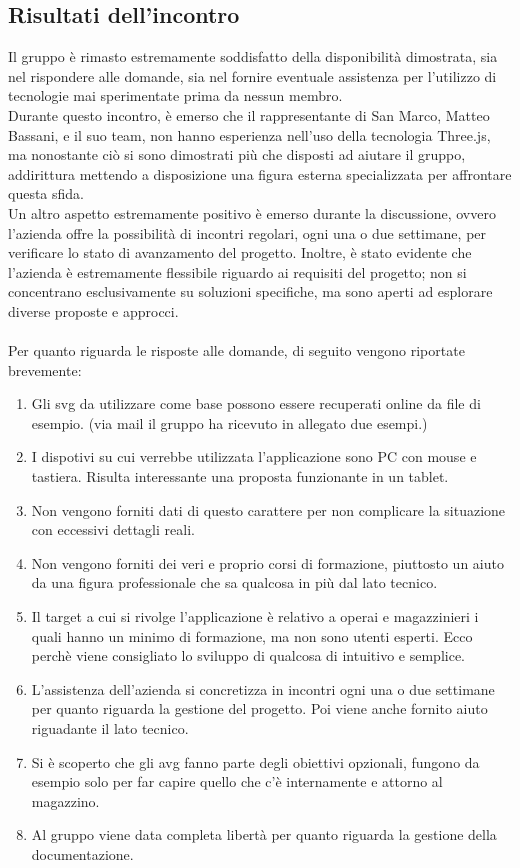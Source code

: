 \subsection{Risultati dell'incontro}
Il gruppo è rimasto estremamente soddisfatto della disponibilità dimostrata, sia nel rispondere alle domande, sia nel fornire eventuale assistenza per l'utilizzo di tecnologie mai sperimentate prima da nessun membro. 
\\ Durante questo incontro, è emerso che il rappresentante di San Marco, Matteo Bassani, e il suo team, non hanno esperienza nell'uso della tecnologia Three.js, ma nonostante ciò si sono dimostrati più che disposti ad aiutare il gruppo, addirittura mettendo a disposizione una figura esterna specializzata per affrontare questa sfida.
\\ Un altro aspetto estremamente positivo è emerso durante la discussione, ovvero l'azienda offre la possibilità di incontri regolari, ogni una o due settimane, per verificare lo stato di avanzamento del progetto. Inoltre, è stato evidente che l'azienda è estremamente flessibile riguardo ai requisiti del progetto; non si concentrano esclusivamente su soluzioni specifiche, ma sono aperti ad esplorare diverse proposte e approcci.
\\ \\ Per quanto riguarda le risposte alle domande, di seguito vengono riportate brevemente:

\begin{enumerate}
    \item Gli svg da utilizzare come base possono essere recuperati online da file di esempio. (via mail il gruppo ha ricevuto in allegato due esempi.)
    \item I dispotivi su cui verrebbe utilizzata l'applicazione sono PC con mouse e tastiera. Risulta interessante una proposta funzionante in un tablet.
    \item Non vengono forniti dati di questo carattere per non complicare la situazione con eccessivi dettagli reali.
    \item Non vengono forniti dei veri e proprio corsi di formazione, piuttosto un aiuto da una figura professionale che sa qualcosa in più dal lato tecnico.
    \item Il target a cui si rivolge l'applicazione è relativo a operai e magazzinieri i quali hanno un minimo di formazione, ma non sono utenti esperti. Ecco perchè viene consigliato lo sviluppo di qualcosa di intuitivo e semplice.
    \item L'assistenza dell'azienda si concretizza in incontri ogni una o due settimane per quanto riguarda la gestione del progetto. Poi viene anche fornito aiuto riguadante il lato tecnico.
    \item Si è scoperto che gli avg fanno parte degli obiettivi opzionali, fungono da esempio solo per far capire quello che c'è internamente e attorno al magazzino.
    \item Al gruppo viene data completa libertà per quanto riguarda la gestione della documentazione. \\
\end{enumerate}

